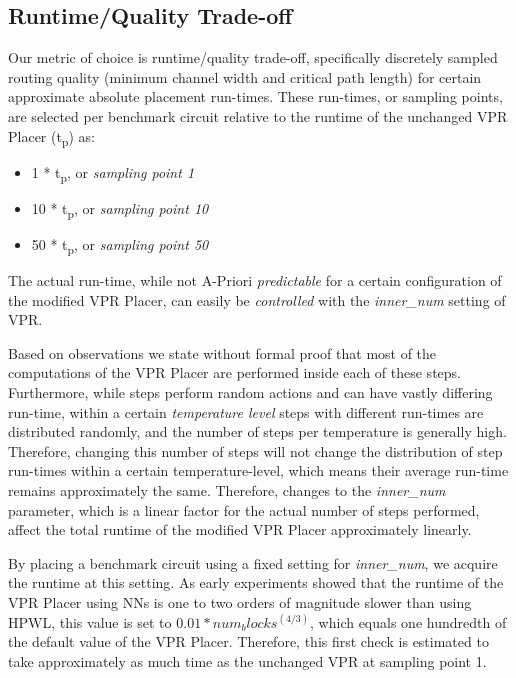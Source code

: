 \subsection{Runtime/Quality Trade-off}

Our metric of choice is runtime/quality trade-off, specifically discretely sampled routing quality (minimum channel width and critical path length) for certain approximate absolute placement run-times. These run-times, or sampling points, are selected per benchmark circuit relative to the runtime of the unchanged \gls{VPR} Placer (t\textsubscript{p}) as:

\begin{itemize}
	\item 1   * t\textsubscript{p}, or \textit{sampling point 1}
	\item 10  * t\textsubscript{p}, or \textit{sampling point 10}
	\item 50  * t\textsubscript{p}, or \textit{sampling point 50}
\end{itemize}

The actual run-time, while not A-Priori \textit{predictable} for a certain configuration of the modified \gls{VPR} Placer, can easily be \textit{controlled} with the \textit{inner\_num} setting of \gls{VPR}.\cite{vtr8} 

Based on observations we state without formal proof that most of the computations of the \gls{VPR} Placer are performed inside each of these steps. Furthermore, while steps perform random actions and can have vastly differing run-time, within a certain \textit{temperature level} steps with different run-times are distributed randomly, and the number of steps per temperature is generally high. Therefore, changing this number of steps will not change the distribution of step run-times within a certain temperature-level, which means their average run-time remains approximately the same. Therefore, changes to the \textit{inner\_num} parameter, which is a linear factor for the actual number of steps performed, affect the total runtime of the modified \gls{VPR} Placer approximately linearly.

By placing a benchmark circuit using a fixed setting for \textit{inner\_num}, we acquire the runtime at this setting. As early experiments showed that the runtime of the \gls{VPR} Placer using \glspl{NN} is one to two orders of magnitude slower than using \gls{HPWL}, this value is set to $0.01*num_blocks^(4/3)$, which equals one hundredth of the default value of the \gls{VPR} Placer. Therefore, this first check is estimated to take approximately as much time as the unchanged \gls{VPR} at sampling point 1.

